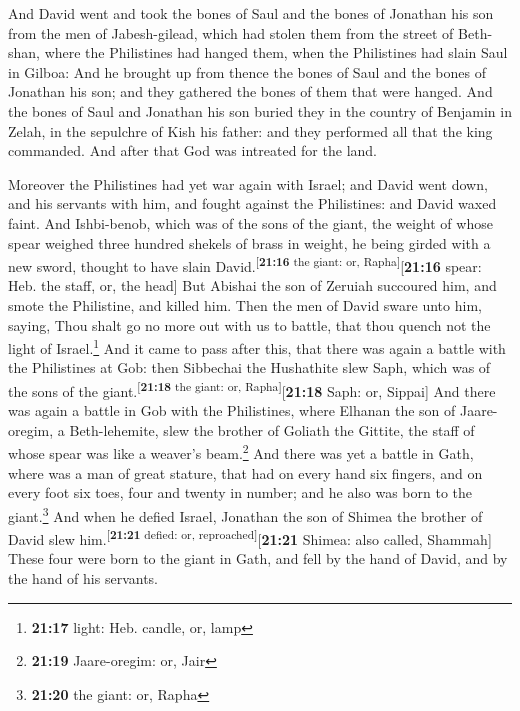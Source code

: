  And David went and took the bones of Saul and the bones
of Jonathan his son from the men of Jabesh-gilead, which had stolen them
from the street of Beth-shan, where the Philistines had hanged them,
when the Philistines had slain Saul in Gilboa:  And he
brought up from thence the bones of Saul and the bones of Jonathan his
son; and they gathered the bones of them that were hanged.
 And the bones of Saul and Jonathan his son buried they
in the country of Benjamin in Zelah, in the sepulchre of Kish his
father: and they performed all that the king commanded. And after that
God was intreated for the land.

 Moreover the Philistines had yet war again with Israel;
and David went down, and his servants with him, and fought against the
Philistines: and David waxed faint.  And Ishbi-benob,
which was of the sons of the giant, the weight of whose spear weighed
three hundred shekels of brass in weight, he being girded with a new
sword, thought to have slain David.\textsuperscript{{[}\textbf{21:16}
the giant: or, Rapha{]}}{[}\textbf{21:16} spear: Heb. the staff, or, the
head{]}  But Abishai the son of Zeruiah succoured him,
and smote the Philistine, and killed him. Then the men of David sware
unto him, saying, Thou shalt go no more out with us to battle, that thou
quench not the light of Israel.\footnote{\textbf{21:17} light: Heb.
  candle, or, lamp}  And it came to pass after this, that
there was again a battle with the Philistines at Gob: then Sibbechai the
Hushathite slew Saph, which was of the sons of the
giant.\textsuperscript{{[}\textbf{21:18} the giant: or,
Rapha{]}}{[}\textbf{21:18} Saph: or, Sippai{]}  And there
was again a battle in Gob with the Philistines, where Elhanan the son of
Jaare-oregim, a Beth-lehemite, slew the brother of Goliath the Gittite,
the staff of whose spear was like a weaver's beam.\footnote{\textbf{21:19}
  Jaare-oregim: or, Jair}  And there was yet a battle in
Gath, where was a man of great stature, that had on every hand six
fingers, and on every foot six toes, four and twenty in number; and he
also was born to the giant.\footnote{\textbf{21:20} the giant: or, Rapha}
 And when he defied Israel, Jonathan the son of Shimea
the brother of David slew him.\textsuperscript{{[}\textbf{21:21} defied:
or, reproached{]}}{[}\textbf{21:21} Shimea: also called, Shammah{]}
 These four were born to the giant in Gath, and fell by
the hand of David, and by the hand of his servants.

